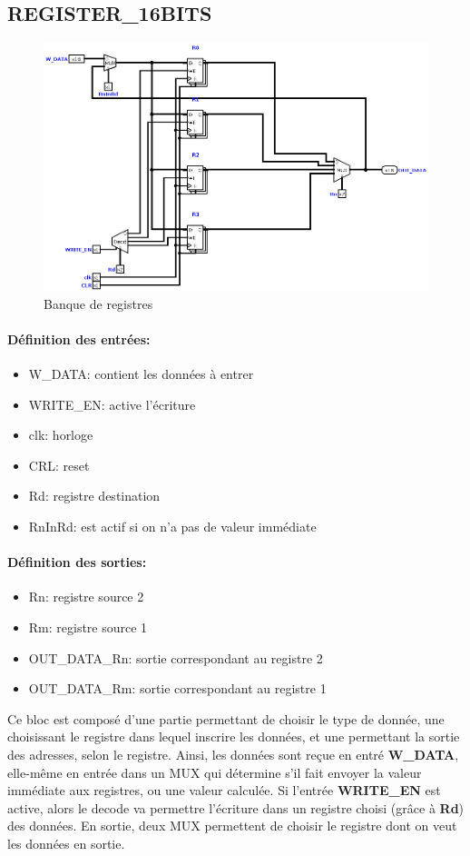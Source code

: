 \documentclass[a4paper]{article} %
\begin{document}
    
\subsection{REGISTER\_16BITS} \label{regi16}
\begin{figure}[H]
    \centering
    \includegraphics[width=.8\textwidth]{src/REGISTERS_16BITS.png}
    \caption{Banque de registres}
    \label{regi16_img}
\end{figure}



\paragraph{Définition des entrées:}
\begin{itemize}
    \item     W\_DATA: contient les données à entrer
    \item     WRITE\_EN: active l'écriture
    \item     clk: horloge
    \item     CRL: reset
    \item     Rd: registre destination
    \item     RnInRd: est actif si on n'a pas de valeur immédiate
\end{itemize}
\paragraph{Définition des sorties:}
\begin{itemize}
    \item Rn: registre source 2
    \item Rm: registre source 1
    \item OUT\_DATA\_Rn: sortie correspondant au registre 2
    \item OUT\_DATA\_Rm: sortie correspondant au registre 1
\end{itemize}
\medskip
Ce bloc est composé d'une partie permettant de choisir le type de donnée, une choisissant le registre dans lequel inscrire les données, et une permettant la sortie des adresses, selon le registre.
Ainsi, les données sont reçue en entré \textbf{W\_DATA}, elle-même en entrée dans un MUX qui détermine s'il fait envoyer la valeur immédiate aux registres, ou une valeur calculée. Si l'entrée \textbf{WRITE\_EN} est active, alors le decode va permettre l'écriture dans un registre choisi (grâce à \textbf{Rd}) des données.
En sortie, deux MUX permettent de choisir le registre dont on veut les données en sortie.
\end{document}
